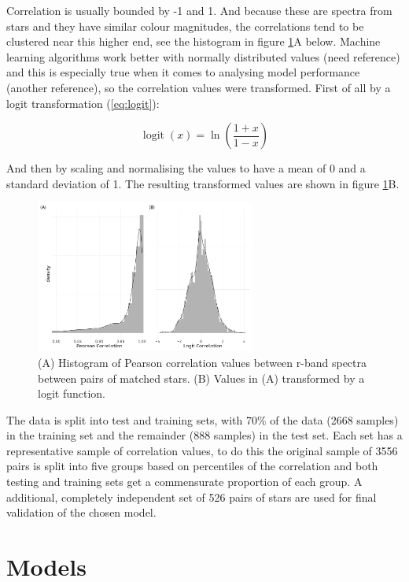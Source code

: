 \documentclass[]{elsarticle} %
\begin{document}
Correlation is usually bounded by -1 and 1. And because these are
spectra from stars and they have similar colour magnitudes, the
correlations tend to be clustered near this higher end, see the
histogram in figure \ref{fig:histograms}A below. Machine learning
algorithms work better with normally distributed values (need reference)
and this is especially true when it comes to analysing model performance
(another reference), so the correlation values were transformed. First
of all by a logit transformation (\ref{eq:logit}):

\begin{equation}
  \displaystyle \operatorname {logit} (x)=\ln \left({\frac {1+x}{1-x}}\right)
  \label{eq:logit}
\end{equation}

And then by scaling and normalising the values to have a mean of 0 and a
standard deviation of 1. The resulting transformed values are shown in
figure \ref{fig:histograms}B.

\begin{figure}
  \includegraphics[width=\columnwidth, height = 5cm]{figures/histograms}
    \caption{(A) Histogram of Pearson correlation values between r-band spectra between pairs of matched stars. (B) Values in (A) transformed by a logit function.}
    \label{fig:histograms}
\end{figure}

The data is split into test and training sets, with 70\% of the data
(2668 samples) in the training set and the remainder (888 samples) in
the test set. Each set has a representative sample of correlation
values, to do this the original sample of 3556 pairs is split into five
groups based on percentiles of the correlation and both testing and
training sets get a commensurate proportion of each group. A additional,
completely independent set of 526 pairs of stars are used for final
validation of the chosen model.

\hypertarget{models}{%
\section{Models}\label{models}}
\end{document}
